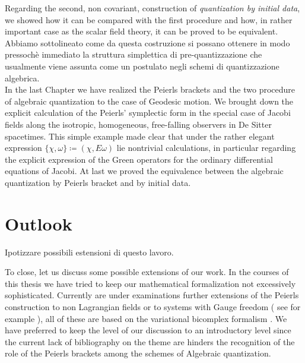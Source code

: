 \documentclass[Main]{subfiles}
\begin{document}
Regarding the second, non covariant, construction of \emph{quantization by initial data}, we showed how it can be compared with the first procedure and how, in rather important case as the scalar field theory, it can be proved to be equivalent.
\ifToninus
Abbiamo sottolineato come da questa costruzione si possano ottenere in modo pressochè immediato la struttura simplettica di pre-quantizzazione che usualmente viene assunta come un postulato negli schemi di quantizzazione algebrica.
\fi
\\
In the last Chapter we have realized the Peierls brackets and the two procedure of algebraic quantization to the case of Geodesic motion.
We brought down the explicit calculation of the Peierls' symplectic form in the special case of Jacobi fields along the isotropic, homogeneous, free-falling  observers in De Sitter spacetimes. This simple example made clear that under the rather elegant expression $\{\chi, \omega\} \coloneqq ( \chi, E \omega)$ lie nontrivial calculations, in particular regarding the explicit expression of the Green operators for the ordinary differential equations of Jacobi.
At last we proved the equivalence between the algebraic quantization by Peierls bracket and by initial data.

\vspace{2mm}%

\ifToninus
\section{Outlook}
Ipotizzare possibili estensioni di questo lavoro.

\fi
To close, let us discuss  some possible extensions of our work.
	In the courses of this thesis we have tried to keep our mathematical formalization not excessively sophisticated. 
	Currently are under examinations further extensions of the Peierls construction to non Lagrangian fields or to systems with Gauge freedom ( see for example \cite{Khavkine} ), all of these are based on the variational bicomplex formalism \cite{G.Sardanashvily2013}.
	We have preferred to keep the level of our discussion to an introductory level since the current lack of bibliography on the theme are hinders the recognition of the role of the Peierls brackets among the schemes of Algebraic quantization.
	
\end{document}
